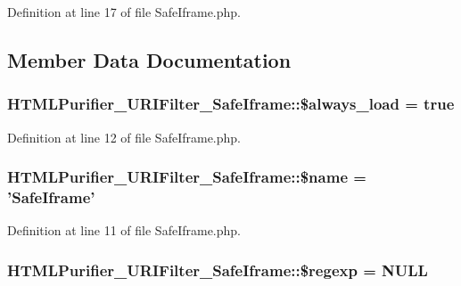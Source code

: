 Definition at line 17 of file Safe\+Iframe.\+php.



\subsection{Member Data Documentation}
\hypertarget{classHTMLPurifier__URIFilter__SafeIframe_a63db7026d31166a6562e5e1544894125}{
\subsubsection[{\$always\+\_\+load}]{\setlength{\rightskip}{0pt plus 5cm}H\+T\+M\+L\+Purifier\+\_\+\+U\+R\+I\+Filter\+\_\+\+Safe\+Iframe\+::\$always\+\_\+load = true}}\label{classHTMLPurifier__URIFilter__SafeIframe_a63db7026d31166a6562e5e1544894125}


Definition at line 12 of file Safe\+Iframe.\+php.

\hypertarget{classHTMLPurifier__URIFilter__SafeIframe_a7da0f2963e27f8fdea9cc3aa9e13a485}{
\subsubsection[{\$name}]{\setlength{\rightskip}{0pt plus 5cm}H\+T\+M\+L\+Purifier\+\_\+\+U\+R\+I\+Filter\+\_\+\+Safe\+Iframe\+::\$name = 'Safe\+Iframe'}}\label{classHTMLPurifier__URIFilter__SafeIframe_a7da0f2963e27f8fdea9cc3aa9e13a485}


Definition at line 11 of file Safe\+Iframe.\+php.

\hypertarget{classHTMLPurifier__URIFilter__SafeIframe_aa1e2f702420080c5c5388d71482579b8}{
\subsubsection[{\$regexp}]{\setlength{\rightskip}{0pt plus 5cm}H\+T\+M\+L\+Purifier\+\_\+\+U\+R\+I\+Filter\+\_\+\+Safe\+Iframe\+::\$regexp = N\+U\+L\+L\hspace{0.3cm}{\ttfamily [protected]}}}\label{classHTMLPurifier__URIFilter__SafeIframe_aa1e2f702420080c5c5388d71482579b8}


